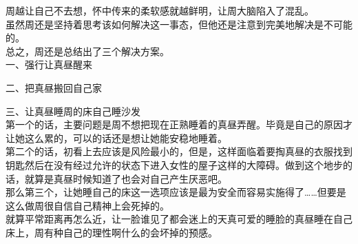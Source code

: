 周越让自己不去想，怀中传来的柔软感就越鲜明，让周大脑陷入了混乱。\\

虽然周还是坚持着思考该如何解决这一事态，但他还是注意到完美地解决是不可能的。\\

总之，周还是总结出了三个解决方案。\\

一、强行让真昼醒来

二、把真昼搬回自己家

三、让真昼睡周的床自己睡沙发\\

第一个的话，主要问题是周不想把现在正熟睡着的真昼弄醒。毕竟是自己的原因才让她这么累的，可以的话还是想让她能安稳地睡着。\\

第二个的话，初看上去应该是风险最小的，但是，这样面临着要掏真昼的衣服找到钥匙然后在没有经过允许的状态下进入女性的屋子这样的大障碍。做到这个地步的话，就算是真昼时候知道了也会对自己产生厌恶吧。\\

那么第三个，让她睡自己的床这一选项应该是最为安全而容易实施得了……但要是这么做周很自信自己精神上会死掉的。\\

就算平常距离再怎么近，让一脸谁见了都会迷上的天真可爱的睡脸的真昼睡在自己床上，周有种自己的理性啊什么的会坏掉的预感。\\

